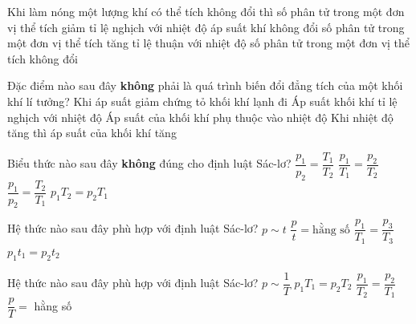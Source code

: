 \begin{ex} %
	Khi làm nóng một lượng khí có thể tích không đổi thì
	\choice
	{số phân tử trong một đơn vị thể tích giảm tỉ lệ nghịch với nhiệt độ}
	{áp suất khí không đổi}
	{số phân tử trong một đơn vị thể tích tăng tỉ lệ thuận với nhiệt độ}
	{\True số phân tử trong một đơn vị thể tích không đổi}
\end{ex}
\begin{ex} %
	Đặc điểm nào sau đây \textbf{không} phải là quá trình biến đổi đẳng tích của một khối khí lí tưởng?
	\choice
	{Khi áp suất giảm chứng tỏ khối khí lạnh đi}
	{\True Áp suất khối khí tỉ lệ nghịch với nhiệt độ}
	{Áp suất của khối khí phụ thuộc vào nhiệt độ}
	{Khi nhiệt độ tăng thì áp suất của khối khí tăng}
\end{ex}
\begin{ex} %
	Biểu thức nào sau đây \textbf{không} đúng cho định luật Sác-lơ?
	\choice
	{$\dfrac{p_1}{p_2} = \dfrac{T_1}{T_2}$}
	{$\dfrac{p_1}{T_1} = \dfrac{p_2}{T_2}$}
	{\True $\dfrac{p_1}{p_2} = \dfrac{T_2}{T_1}$}
	{${p_1}{T_2} = {p_2}{T_1}$}
\end{ex}
\begin{ex}%
	Hệ thức nào sau đây phù hợp với định luật Sác-lơ?
	\choice
	{$p\sim t$}
	{$\dfrac{p}{t} = \text{hằng số}$}
	{\True $\dfrac{p_1}{T_1} = \dfrac{p_3}{T_3}$}
	{$p_1t_1=p_2t_2$}
\end{ex}
\begin{ex} %
	Hệ thức nào sau đây phù hợp với định luật Sác-lơ?	
	\choice
	{$p \sim \dfrac{1}{T}$}
	{${p_1}{T_1} = {p_2}{T_2}$}
	{$\dfrac{p_1}{T_2} = \dfrac{p_2}{T_1}$}
	{\True $\dfrac{p}{T} =$ hằng số}
	
\end{ex}
